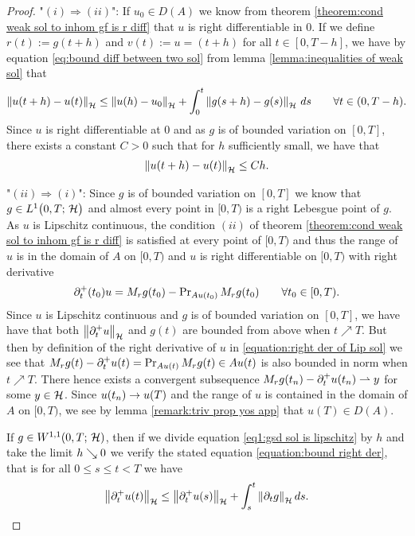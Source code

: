 \begin{proof}
	"$ (i)\Rightarrow(ii) $": If $ u_0\in D(A) $
	we know from theorem \ref{theorem:cond weak sol to inhom gf is r diff}
	that $ u $ is right differentiable in $ 0 $.
	If we define $ r(t):=g(t+h) $ and $ v(t):=u=(t+h) $
	for all $ t\in [0,T-h] $, we have by equation
	\eqref{eq:bound diff between two sol} from 
	lemma \ref{lemma:inequalities of weak sol} that
	\begin{align}\label{eq1:gsd sol is lipschitz}
		\left\Vert u(t+h)-u(t)\right\Vert_{\mathcal{H}}
		\leq \left\Vert u(h)-u_0\right\Vert_{\mathcal{H}}+\int_0^t \left\Vert g(s+h)-g(s)\right\Vert_{\mathcal{H}}\,ds
		\qquad\forall t\in(0,T-h).
	\end{align}
	Since $ u $ is right differentiable at $ 0 $
	and as $ g $ is of bounded variation on $ [0,T] $, 
	there exists a constant $ C>0 $ such that 
	for $ h $ sufficiently small, we have that
	\begin{align*}
		\left\Vert u(t+h)-u(t)\right\Vert_{\mathcal{H}}
		\leq Ch.
	\end{align*}
	
	"$ (ii)\Rightarrow(i) $": Since $ g $
	is of bounded variation on $ [0,T] $
	we know that $ g\in L^{1}\big(0,T;\,\mathcal{H}\big) $
	and almost every point in $ [0,T) $
	is a right Lebesgue point of $ g $. As $ u $
	is Lipschitz continuous, the condition $ (ii) $ of theorem
	\ref{theorem:cond weak sol to inhom gf is r diff}
	is satisfied at every point of $ [0,T) $ and thus 
	the range of $ u $ is in the domain of $ A $
	on $ [0,T) $ and $ u $ is right differentiable
	on $ [0,T) $ with right derivative
	\begin{align*}
		\partial_t^+(t_0) u=M_rg(t_0)-\operatorname{\mathrm{Pr}}_{Au(t_0)} M_rg(t_0)
		\qquad\forall t_0\in [0,T).
	\end{align*} 
	Since $ u $ is Lipschitz continuous and $ g $ is of
	bounded variation on $ [0,T] $, we have have
	that both $ \left\Vert \partial_t^+ u\right\Vert_{\mathcal{H}} $ and $ g(t) $ are bounded from above
	when $ t\nearrow T $.
	But then by definition
	of the right derivative of $ u $ in 
	\eqref{equation:right der of Lip sol}
	we see that $ M_rg(t)-\partial_t^+ u(t)=\operatorname{\mathrm{Pr}}_{Au(t)} M_rg(t)\in Au(t) $
	is also bounded in norm when $ t\nearrow T $.
	There hence exists a convergent subsequence
	$ M_rg(t_n)-\partial_t^+ u(t_n)\rightharpoonup y $ for some
	$ y\in\mathcal{H} $. Since $ u(t_n)\rightarrow u(T) $ 
	and the range of $ u $
	is contained in the domain of $ A $
	on $ [0,T) $, we see by lemma 
	\ref{remark:triv prop yos app} that $ u(T)\in D(A) $.
	\smallskip
	
	If $ g\in W^{1,1}(0,T;\,\mathcal{H}) $, then if we divide
	equation \eqref{eq1:gsd sol is lipschitz}
	by $ h $ and take the limit $ h\searrow 0 $
	we verify the stated equation \eqref{equation:bound right der},
	that is for all $ 0\leq s\leq t<T $ we have
	\begin{align*}
		\left\Vert \partial_t^+ u(t)\right\Vert_{\mathcal{H}}
		\leq \left\Vert \partial_t^+ u(s)\right\Vert_{\mathcal{H}}+\int_s^t \left\Vert \partial_t g\right\Vert_{\mathcal{H}} ds.
	\end{align*}
\end{proof}
